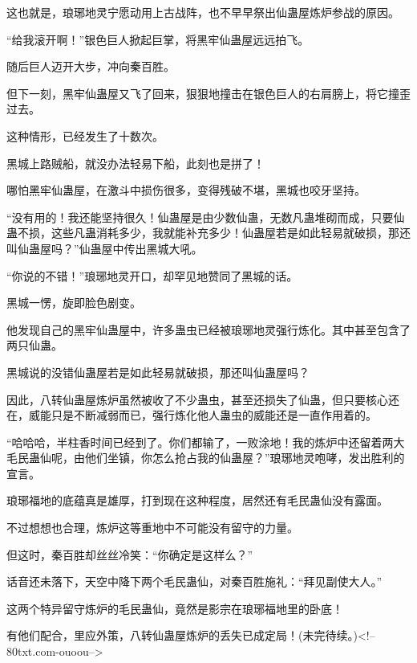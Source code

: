 \begin{this_body}
这也就是，琅琊地灵宁愿动用上古战阵，也不早早祭出仙蛊屋炼炉参战的原因。

“给我滚开啊！”银色巨人掀起巨掌，将黑牢仙蛊屋远远拍飞。

随后巨人迈开大步，冲向秦百胜。

但下一刻，黑牢仙蛊屋又飞了回来，狠狠地撞击在银色巨人的右肩膀上，将它撞歪过去。

这种情形，已经发生了十数次。

黑城上路贼船，就没办法轻易下船，此刻也是拼了！

哪怕黑牢仙蛊屋，在激斗中损伤很多，变得残破不堪，黑城也咬牙坚持。

“没有用的！我还能坚持很久！仙蛊屋是由少数仙蛊，无数凡蛊堆砌而成，只要仙蛊不损，这些凡蛊消耗多少，我就能补充多少！仙蛊屋若是如此轻易就破损，那还叫仙蛊屋吗？”仙蛊屋中传出黑城大吼。

“你说的不错！”琅琊地灵开口，却罕见地赞同了黑城的话。

黑城一愣，旋即脸色剧变。

他发现自己的黑牢仙蛊屋中，许多蛊虫已经被琅琊地灵强行炼化。其中甚至包含了两只仙蛊。

黑城说的没错仙蛊屋若是如此轻易就破损，那还叫仙蛊屋吗？

因此，八转仙蛊屋炼炉虽然被收了不少蛊虫，甚至还损失了仙蛊，但只要核心还在，威能只是不断减弱而已，强行炼化他人蛊虫的威能还是一直作用着的。

“哈哈哈，半柱香时间已经到了。你们都输了，一败涂地！我的炼炉中还留着两大毛民蛊仙呢，由他们坐镇，你怎么抢占我的仙蛊屋？”琅琊地灵咆哮，发出胜利的宣言。

琅琊福地的底蕴真是雄厚，打到现在这种程度，居然还有毛民蛊仙没有露面。

不过想想也合理，炼炉这等重地中不可能没有留守的力量。

但这时，秦百胜却丝丝冷笑：“你确定是这样么？”

话音还未落下，天空中降下两个毛民蛊仙，对秦百胜施礼：“拜见副使大人。”

这两个特异留守炼炉的毛民蛊仙，竟然是影宗在琅琊福地里的卧底！

有他们配合，里应外策，八转仙蛊屋炼炉的丢失已成定局！(未完待续。)<!--80txt.com-ouoou-->

\end{this_body}

